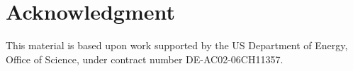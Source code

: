 \documentclass[conference]{IEEEtran}
\begin{document}
\section*{Acknowledgment}
This material is based upon work supported by the US
Department of Energy, Office of Science, under contract number DE-AC02-06CH11357.



\end{document}
